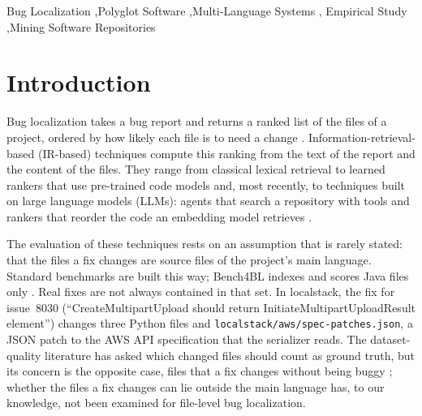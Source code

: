 \documentclass[a4paper,fleqn]{cas-dc}
\begin{document}
\begin{keywords}
Bug Localization \sep Polyglot Software \sep Multi-Language Systems \sep
Empirical Study \sep Mining Software Repositories
\end{keywords}

\maketitle

\section{Introduction}\label{sec:intro}

Bug localization takes a bug report and returns a ranked list of the files of a
project, ordered by how likely each file is to need a change
\citep{zhou2012should,lee2018bench4bl}. Information-retrieval-based (IR-based)
techniques compute this ranking from the text of the report and the content of
the files. They range from classical lexical retrieval
\citep{robertson2009probabilistic,zhou2012should} to learned rankers that use
pre-trained code models \citep{liang2022modeling,chakraborty2025blaze} and,
most recently, to techniques built on large language models (LLMs): agents
that search a repository with tools
\citep{yang2024sweagent,xia2024agentless,chen2025locagent} and rankers that
reorder the code an embedding model retrieves \citep{reddy2025swerank}.

The evaluation of these techniques rests on an assumption that is rarely
stated: that the files a fix changes are source files of the project's main
language. Standard benchmarks are built this way; Bench4BL indexes and scores
Java files only \citep{lee2018bench4bl}. Real fixes are not always contained
in that set. In localstack, the fix for issue~8030 (``CreateMultipartUpload
should return InitiateMultipartUploadResult element'') changes three Python
files and \texttt{localstack/aws/spec-patches.json}, a JSON patch to the AWS
API specification that the serializer reads. The dataset-quality literature
has asked which changed files should count as ground truth, but its concern is
the opposite case, files that a fix changes without being buggy
\citep{kochhar2014potential}; whether the files a fix changes can lie outside
the main language has, to our knowledge, not been examined for file-level bug
localization.
\end{document}
